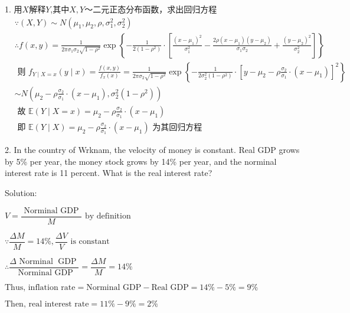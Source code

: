  1. 用$ X $解释$ Y $,其中$ X,Y $～二元正态分布函数，求出回归方程	
\begin{equation*}
	\begin{aligned}
		& \because(X, Y) \sim N\left(\mu_{1}, \mu_{2}, \rho, \sigma_{1}^{2}, \sigma_{2}^{2}\right) \\
		& \therefore f(x, y)=\frac{1}{2 \pi \sigma_{1} \sigma_{2} \sqrt{1-\rho^{2}}} \exp \left\{-\frac{1}{2\left(1-\rho^{2}\right)} \cdot\left[\frac{\left(x-\mu_{1}\right)^{2}}{\sigma_{1}^{2}}-\frac{2 \rho\left(x-\mu_{1}\right)\left(y-\mu_{2}\right)}{\sigma_{1} \sigma_{2}}+\frac{\left(y-\mu_{2}\right)^{2}}{\sigma_{2}^{2}}\right]\right\} \\
		& \text { 则 } f_{Y \mid X=x}(y \mid x) = \frac{f(x, y)}{f_{x}(x)} 
		= \frac{1}{2 \pi \sigma_{2} \sqrt{1-\rho^{2}}} \exp \left\{-\frac{1}{2 \sigma_{2}^{2}\left(1-\rho^{2}\right)} \cdot\left[y-\mu_{2}-\rho \frac{\sigma_{2}}{\sigma_{1}} \cdot\left(x-\mu_{1}\right)\right]^{2}\right\} \\
		& \sim N\left(\mu_{2}-\rho \frac{\sigma_{2}}{\sigma_{1}} \cdot\left(x-\mu_{1}\right), \sigma_{2}^{2}\left(1-\rho^{2}\right)\right) \\
		& \text { 故 } \mathbb{E}(Y \mid X=x)=\mu_{2}-\rho \frac{\sigma_{2}}{\sigma_{1}} \cdot\left(x-\mu_{1}\right) \\
		& \text { 即 }\mathbb{E}(Y \mid X)=\mu_{2}-\rho \frac{\sigma_{2}}{\sigma_{1}} \cdot\left(x-\mu_{1}\right) \text { 为其回归方程 }
	\end{aligned}
\end{equation*}

 2. In the country of Wrknam, the velocity of money is constant. Real GDP grows by 5\% per year, the money stock grows by 14\% per year, and the norminal interest rate is 11 percent. What is the real interest rate?

 Solution:
 
 $ V=\dfrac{\text { Norminal GDP }}{M} \text{ by definition }  $

 $ \because \dfrac{\Delta M}{M}=14\%, \dfrac{\Delta V}{V} \text{ is constant } $ \vspace{0.5em}

 $ \therefore \dfrac{\Delta \text { Norminal } \operatorname{GDP}}{\text { Norminal } \mathrm{GDP}}=\dfrac{\Delta M}{M}=14 \%  $ \vspace{0.5em}

 $ \text{Thus, inflation rate} = \text{Norminal GDP}- \text{Real GDP}=14\%-5\%=9\%  $

 $ \text{Then, real interest rate} = 11\%-9\%=2\% $

